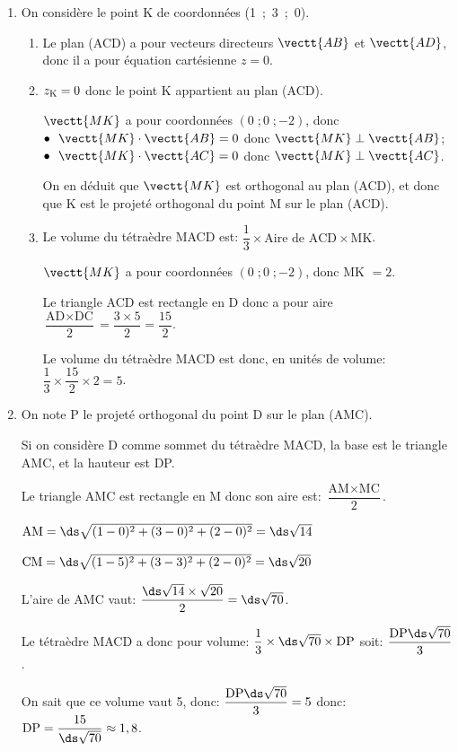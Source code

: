 \begin{enumerate}[resume]
\item On considère le point K de coordonnées (1~;~3~;~0).
	\begin{enumerate}
		\item%
Le plan (ACD) a pour vecteurs directeurs $\vectt{AB}$ et $\vectt{AD}$, donc il a pour équation cartésienne $z=0$.
		
		\item %
$z_{\text K}=0$ donc le point K appartient au plan (ACD).

$\vectt{MK}$ a pour coordonnées $(0\;; 0\;; -2)$, donc \\
$\bullet~~\vectt{MK}\cdot\vectt{AB} = 0$ donc $\vectt{MK}\perp\vectt{AB}$;\\
$\bullet~~\vectt{MK}\cdot\vectt{AC} = 0$ donc $\vectt{MK}\perp\vectt{AC}$.

On en déduit que $\vectt{MK}$ est orthogonal au plan (ACD), et donc que K est le projeté orthogonal du point M sur le plan (ACD).
	
		\item Le volume du tétraèdre MACD est:
$\dfrac{1}{3}\times \text{Aire de ACD} \times \text{MK}$.

$\vectt{MK}$ a pour coordonnées $(0\;; 0\;; -2)$, donc MK $=2$.

Le triangle ACD est rectangle en D donc a pour aire 
$\dfrac{\text{AD}\times\text{DC}}{2}=\dfrac{ 3\times 5}{2}=\dfrac{15}{2}$.

Le volume du tétraèdre MACD est donc, en unités de volume:
$\dfrac{1}{3} \times \dfrac{15}{2} \times 2 = 5$.

\end{enumerate}	
	
\item On note P le projeté orthogonal du point D sur le plan (AMC).


Si on considère D comme sommet du tétraèdre MACD, la base est le triangle AMC, et la hauteur est DP.

Le triangle AMC est rectangle en M donc son aire est:
$\dfrac{\text{AM} \times \text{MC}}{2}$.

$\text{AM} = \ds\sqrt{(1-0)^2+(3-0)^2+(2-0)^2} = \ds\sqrt{14}$

$\text{CM} = \ds\sqrt{(1-5)^2+(3-3)^2+(2-0)^2}= \ds\sqrt{20}$

L'aire de AMC vaut: $\dfrac{\ds\sqrt{14}\times \sqrt{20}}{2}=\ds\sqrt{70}$.

Le tétraèdre MACD a donc pour volume: $\dfrac{1}{3}\times\ds\sqrt{70}\times\text{DP}$ soit: $\dfrac{\text{DP} \ds\sqrt{70}}{3}$.

On sait que ce volume vaut 5, donc: 
$\dfrac{\text{DP} \ds\sqrt{70}}{3} = 5$ donc:
$\text{DP}= \dfrac{15}{\ds\sqrt{70}} \approx 1,8$.
\end{enumerate}

